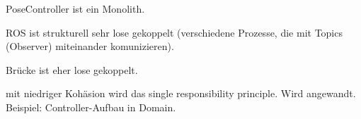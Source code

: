



PoseController ist ein Monolith.

ROS ist strukturell sehr lose gekoppelt (verschiedene Prozesse, die mit Topics (Observer) miteinander komunizieren).

Brücke ist eher lose gekoppelt.






mit niedriger Kohäsion wird das single responsibility principle.
Wird angewandt. Beispiel: Controller-Aufbau in Domain.


